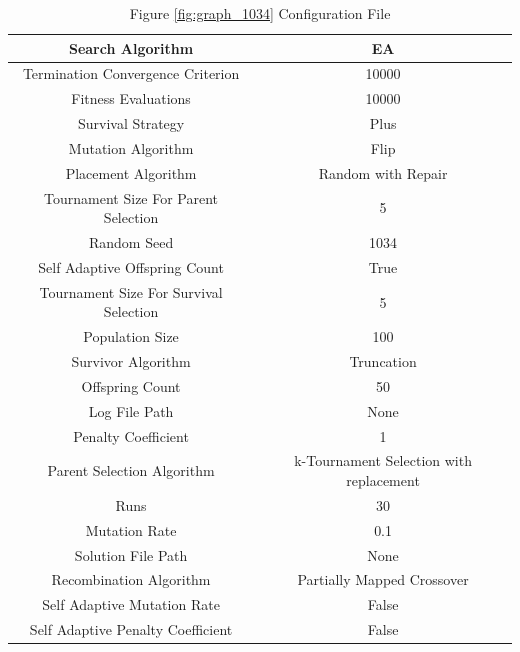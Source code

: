 \documentclass{standalone}
\begin{document}
\begin{table}[!htb]
	\centering
	\caption{Figure \ref{fig:graph_1034} Configuration File}
	\label{tab:graph_1034}
	\begin{tabular}{| c | c |}
		\hline
		Search Algorithm		& EA		 \\
		\hline
		Termination Convergence Criterion		& 10000		 \\
		\hline
		Fitness Evaluations		& 10000		 \\
		\hline
		Survival Strategy		& Plus		 \\
		\hline
		Mutation Algorithm		& Flip		 \\
		\hline
		Placement Algorithm		& Random with Repair		 \\
		\hline
		Tournament Size For Parent Selection		& 5		 \\
		\hline
		Random Seed		& 1034		 \\
		\hline
		Self Adaptive Offspring Count		& True		 \\
		\hline
		Tournament Size For Survival Selection		& 5		 \\
		\hline
		Population Size		& 100		 \\
		\hline
		Survivor Algorithm		& Truncation		 \\
		\hline
		Offspring Count		& 50		 \\
		\hline
		Log File Path		& None		 \\
		\hline
		Penalty Coefficient		& 1		 \\
		\hline
		Parent Selection Algorithm		& k-Tournament Selection with replacement		 \\
		\hline
		Runs		& 30		 \\
		\hline
		Mutation Rate		& 0.1		 \\
		\hline
		Solution File Path		& None		 \\
		\hline
		Recombination Algorithm		& Partially Mapped Crossover		 \\
		\hline
		Self Adaptive Mutation Rate		& False		 \\
		\hline
		Self Adaptive Penalty Coefficient		& False		 \\
		\hline
	\end{tabular}
\end{table}
\end{document}
